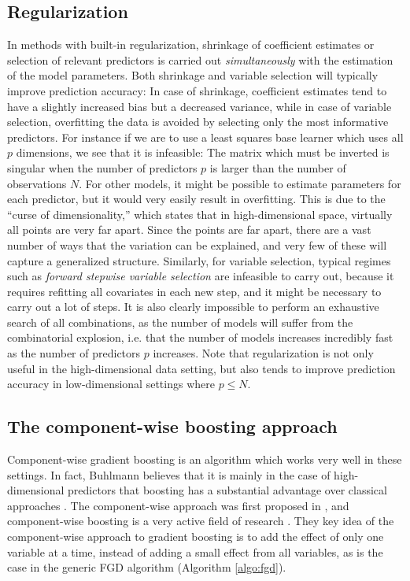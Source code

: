\subsection{Regularization}
In methods with built-in regularization, shrinkage of coefficient estimates or selection of relevant predictors is carried out \textit{simultaneously} with the estimation of the model parameters.
Both shrinkage and variable selection will typically improve prediction accuracy:
In case of shrinkage, coefficient estimates tend to have a slightly increased bias but a decreased variance, while in case of variable selection, overfitting the data is avoided by selecting only the most informative predictors.
For instance if we are to use a least squares base learner which uses all $p$ dimensions, we see that it is infeasible:
The matrix which must be inverted is singular when the number of predictors $p$ is larger than the number of observations $N$.
For other models, it might be possible to estimate parameters for each predictor, but it would very easily result in overfitting.
This is due to the ``curse of dimensionality,'' which states that in high-dimensional space, virtually all points are very far apart.
Since the points are far apart, there are a vast number of ways that the variation can be explained, and very few of these will capture a generalized structure.
Similarly, for variable selection, typical regimes such as \textit{forward stepwise variable selection} are infeasible to carry out, because it requires refitting all covariates in each new step, and it might be necessary to carry out a lot of steps.
It is also clearly impossible to perform an exhaustive search of all combinations, as the number of models will suffer from the combinatorial explosion, i.e. that the number of models increases incredibly fast as the number of predictors $p$ increases.
Note that regularization is not only useful in the high-dimensional data setting, but also tends to improve prediction accuracy in low-dimensional settings where $p\leq N$.

\subsection{The component-wise boosting approach}
Component-wise gradient boosting is an algorithm which works very well in these settings.
In fact, Buhlmann believes that it is mainly in the case of high-dimensional predictors that boosting has a substantial advantage over classical approaches \citep{buhlmann2006}.
The component-wise approach was first proposed in \citep{buhlmann-yu}, and component-wise boosting is a very active field of research \citep{buhlmann2006, mayr14a, mayr14b, mayr17}.
They key idea of the component-wise approach to gradient boosting is to add the effect of only one variable at a time, instead of adding a small effect from all variables, as is the case in the generic FGD algorithm (Algorithm \ref{algo:fgd}).

